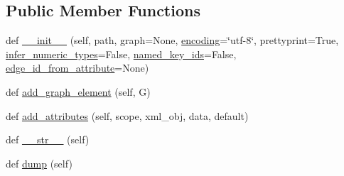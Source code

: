 \subsection*{Public Member Functions}
\begin{DoxyCompactItemize}
\item 
def \hyperlink{classnetworkx_1_1readwrite_1_1graphml_1_1GraphMLWriterLxml_a24a50f0eb2ea208ef8534675260cb267}{\+\_\+\+\_\+init\+\_\+\+\_\+} (self, path, graph=None, \hyperlink{classnetworkx_1_1readwrite_1_1graphml_1_1GraphMLWriter_a93b124d7c7e1d80add7c8e54a7f0df0a}{encoding}=\char`\"{}utf-\/8\char`\"{}, prettyprint=True, \hyperlink{classnetworkx_1_1readwrite_1_1graphml_1_1GraphMLWriterLxml_a6aa937555aad8dd7b98c9c3e7ccc2021}{infer\+\_\+numeric\+\_\+types}=False, \hyperlink{classnetworkx_1_1readwrite_1_1graphml_1_1GraphMLWriterLxml_a16d7a53f2b9545e47730500b82af311d}{named\+\_\+key\+\_\+ids}=False, \hyperlink{classnetworkx_1_1readwrite_1_1graphml_1_1GraphMLWriterLxml_ab1b90213dc2a5935a7f8e00cae76c50d}{edge\+\_\+id\+\_\+from\+\_\+attribute}=None)
\item 
def \hyperlink{classnetworkx_1_1readwrite_1_1graphml_1_1GraphMLWriterLxml_ad6b7e34382d30c889eb5b262cc2558b0}{add\+\_\+graph\+\_\+element} (self, G)
\item 
def \hyperlink{classnetworkx_1_1readwrite_1_1graphml_1_1GraphMLWriterLxml_a106ec5942ff786ded1782edb40103e29}{add\+\_\+attributes} (self, scope, xml\+\_\+obj, data, default)
\item 
def \hyperlink{classnetworkx_1_1readwrite_1_1graphml_1_1GraphMLWriterLxml_a3a3556250963d510eb6f6b4e1217bd55}{\+\_\+\+\_\+str\+\_\+\+\_\+} (self)
\item 
def \hyperlink{classnetworkx_1_1readwrite_1_1graphml_1_1GraphMLWriterLxml_aa7c6683bd3adacb98f97179e738b0373}{dump} (self)
\end{DoxyCompactItemize}
